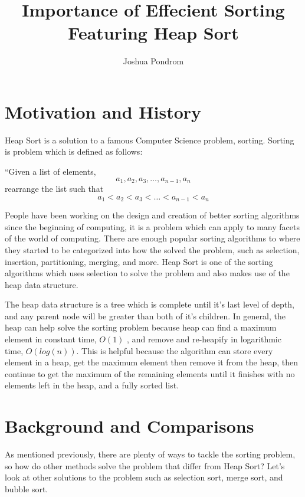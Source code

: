 \documentclass{article}
\begin{document}
\title{Importance of Effecient Sorting\\\large Featuring Heap Sort}
\author{Joshua Pondrom}
\maketitle

\section{Motivation and History}

Heap Sort is a solution to a famous Computer Science problem, sorting. Sorting is problem which is defined as follows: 

\begin{center}“Given a list of elements, \[a_1, a_2, a_3, \ldots, a_{n-1},a_n\] 
rearrange the list such that \[a_1 < a_2 <  a_3 < \ldots < a_{n-1} < a_n\] 
\end{center}
People have been working on the design and creation of better sorting algorithms since the beginning of computing, it is a problem which can apply to many facets of the world of computing. There are enough popular sorting algorithms to where they started to be categorized into how the solved the problem, such as selection, insertion, partitioning, merging, and more. Heap Sort is one of the sorting algorithms which uses selection to solve the problem and also makes use of the heap data structure.

The heap data structure is a tree which is complete until it’s last level of depth, and any parent node will be greater than both of it’s children. In general, the heap can help solve the sorting problem because heap can find a maximum element in constant time, $O(1)$ , and remove and re-heapify in logarithmic time, $O(log(n))$. This is helpful because the algorithm can store every element in a heap, get the maximum element then remove it from the heap, then continue to get the maximum of the remaining elements until it finishes with no elements left in the heap, and a fully sorted list.
\newpage
\section{Background and Comparisons}
As mentioned previously, there are plenty of ways to tackle the sorting problem, so how do other methods solve the problem that differ from Heap Sort? Let’s look at other solutions to the problem such as selection sort, merge sort, and bubble sort.
\end{document}
